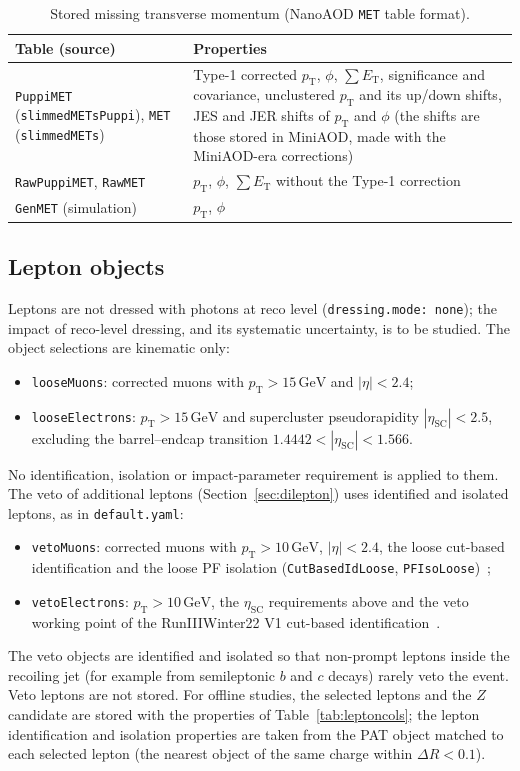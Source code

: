 \documentclass[11pt]{article}
\newcommand{\pt}{p_{\mathrm{T}}}
\newcommand{\GeV}{\ensuremath{\,\mathrm{GeV}}}
\newcommand{\code}[1]{\texttt{#1}}
\begin{document}
\begin{table}[htbp]
\centering
\caption{Stored missing transverse momentum (NanoAOD \code{MET} table format).}
\label{tab:metcols}
\small
\begin{tabularx}{\textwidth}{>{\raggedright\arraybackslash}p{3.3cm}>{\raggedright\arraybackslash}X}
\toprule
Table (source) & Properties \\
\midrule
\code{PuppiMET} (\code{slimmedMETsPuppi}), \code{MET} (\code{slimmedMETs}) & Type-1 corrected $\pt$, $\phi$,
  $\sum E_\mathrm{T}$, significance and covariance, unclustered $\pt$ and its up/down shifts, JES and JER shifts of
  $\pt$ and $\phi$ (the shifts are those stored in MiniAOD, made with the MiniAOD-era corrections) \\
\code{RawPuppiMET}, \code{RawMET} & $\pt$, $\phi$, $\sum E_\mathrm{T}$ without the Type-1 correction \\
\code{GenMET} (simulation) & $\pt$, $\phi$ \\
\bottomrule
\end{tabularx}
\end{table}

\subsection{Lepton objects}
\label{sec:objects}
Leptons are not dressed with photons at reco level (\code{dressing.mode: none}); the impact of reco-level dressing,
and its systematic uncertainty, is to be studied. The object selections are kinematic only:
\begin{itemize}
\item \code{looseMuons}: corrected muons with $\pt > 15\GeV$ and $|\eta| < 2.4$;
\item \code{looseElectrons}: $\pt > 15\GeV$ and supercluster pseudorapidity $|\eta_\mathrm{SC}| < 2.5$, excluding the
  barrel--endcap transition $1.4442 < |\eta_\mathrm{SC}| < 1.566$.
\end{itemize}
No identification, isolation or impact-parameter requirement is applied to them. The veto of additional leptons
(Section~\ref{sec:dilepton}) uses identified and isolated leptons, as in \code{default.yaml}:
\begin{itemize}
\item \code{vetoMuons}: corrected muons with $\pt > 10\GeV$, $|\eta| < 2.4$, the loose cut-based identification and the
  loose PF isolation (\code{CutBasedIdLoose}, \code{PFIsoLoose})~\cite{MUOrecommendations};
\item \code{vetoElectrons}: $\pt > 10\GeV$, the $\eta_\mathrm{SC}$ requirements above and the veto working point of the
  RunIIIWinter22 V1 cut-based identification~\cite{EGMcutid}.
\end{itemize}
The veto objects are identified and isolated so that non-prompt leptons inside the recoiling jet (for example from
semileptonic $b$ and $c$ decays) rarely veto the event. Veto leptons are not stored. For offline studies, the selected leptons and the $Z$
candidate are stored with the properties of Table~\ref{tab:leptoncols}; the lepton identification and isolation
properties are taken from the PAT object matched to each selected lepton (the nearest object of the same charge within
$\Delta R < 0.1$).
\end{document}
